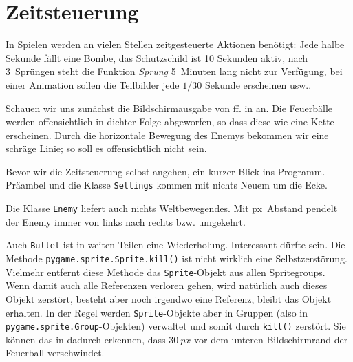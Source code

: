 \newpage
\section{Zeitsteuerung}\label{secZeitstuerung}
In Spielen werden an vielen Stellen zeitgesteuerte Aktionen benötigt: Jede halbe Sekunde fällt eine Bombe, das Schutzschild ist 10 Sekunden aktiv, nach 3~Sprüngen steht die Funktion \emph{Sprung} 5~Minuten lang nicht zur Verfügung, bei einer Animation sollen die Teilbilder jede $1/30$ Sekunde erscheinen usw..

Schauen wir uns zunächst die Bildschirmausgabe von ff. in  an. Die Feuerbälle werden offensichtlich in dichter Folge abgeworfen, so dass diese wie eine Kette erscheinen. Durch die horizontale Bewegung des Enemys bekommen wir eine schräge Linie; so soll es offensichtlich nicht sein. 


Bevor wir die Zeitsteuerung selbst angehen, ein kurzer Blick ins Programm. Präambel und die Klasse \texttt{Settings} kommen mit nichts Neuem um die Ecke.


Die Klasse \texttt{Enemy} liefert auch nichts Weltbewegendes. Mit \unit[10]{px}~Abstand pendelt der Enemy immer von links nach rechts bzw. umgekehrt.


Auch \texttt{Bullet} ist in weiten Teilen eine Wiederholung. Interessant dürfte  sein. Die Methode \texttt{pygame.sprite.Sprite.kill()} ist nicht wirklich eine Selbstzerstörung. Vielmehr entfernt diese Methode das \texttt{Sprite}-Objekt aus allen Spritegroups. Wenn damit auch alle Referenzen verloren gehen, wird natürlich auch dieses Objekt zerstört, besteht aber noch irgendwo eine Referenz, bleibt das Objekt erhalten. In der Regel werden \texttt{Sprite}-Objekte aber in Gruppen (also in \texttt{pygame.sprite.Group}-Objekten) verwaltet und somit durch \texttt{kill()} zerstört. Sie können das in  dadurch erkennen, dass $30~px$ vor dem unteren Bildschirmrand der Feuerball verschwindet.

